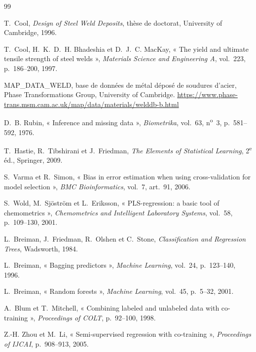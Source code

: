 
\begin{thebibliography}{99}
\small
\setlength{\itemsep}{1pt}

T.~Cool, \emph{Design of Steel Weld Deposits}, thèse de doctorat, University of
Cambridge, 1996.

T.~Cool, H.~K.~D.~H. Bhadeshia et D.~J.~C. MacKay, « The yield and ultimate tensile
strength of steel welds », \emph{Materials Science and Engineering A}, vol.~223,
p.~186--200, 1997.

MAP\_DATA\_WELD, base de données de métal déposé de soudures d'acier, Phase
Transformations Group, University of Cambridge.
\url{https://www.phase-trans.msm.cam.ac.uk/map/data/materials/welddb-b.html}

D.~B. Rubin, « Inference and missing data », \emph{Biometrika}, vol.~63, n\textsuperscript{o}~3,
p.~581--592, 1976.

T.~Hastie, R.~Tibshirani et J.~Friedman, \emph{The Elements of Statistical Learning},
2\textsuperscript{e} éd., Springer, 2009.

S.~Varma et R.~Simon, « Bias in error estimation when using cross-validation for model
selection », \emph{BMC Bioinformatics}, vol.~7, art.~91, 2006.

S.~Wold, M.~Sjöström et L.~Eriksson, « PLS-regression: a basic tool of chemometrics »,
\emph{Chemometrics and Intelligent Laboratory Systems}, vol.~58, p.~109--130, 2001.

L.~Breiman, J.~Friedman, R.~Olshen et C.~Stone, \emph{Classification and Regression
Trees}, Wadsworth, 1984.

L.~Breiman, « Bagging predictors », \emph{Machine Learning}, vol.~24, p.~123--140, 1996.

L.~Breiman, « Random forests », \emph{Machine Learning}, vol.~45, p.~5--32, 2001.

A.~Blum et T.~Mitchell, « Combining labeled and unlabeled data with co-training »,
\emph{Proceedings of COLT}, p.~92--100, 1998.

Z.-H. Zhou et M.~Li, « Semi-supervised regression with co-training », \emph{Proceedings
of IJCAI}, p.~908--913, 2005.


\end{thebibliography}
